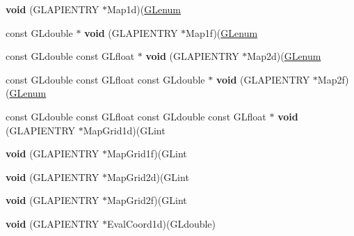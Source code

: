 \begin{DoxyCompactItemize}
{\bfseries void} (G\+L\+A\+P\+I\+E\+N\+T\+RY $\ast$Map1d)(\hyperlink{interfacevoid}{G\+Lenum}
\item 
\mbox{\label{struct_____g_ldispatch_table_rec_a715462dc54fd705c0dee53e9518c5414}} 
const G\+Ldouble $\ast$ {\bfseries void} (G\+L\+A\+P\+I\+E\+N\+T\+RY $\ast$Map1f)(\hyperlink{interfacevoid}{G\+Lenum}
\item 
\mbox{\label{struct_____g_ldispatch_table_rec_a8ffaff6e7fedf7ed349976aed5d0059e}} 
const G\+Ldouble const G\+Lfloat $\ast$ {\bfseries void} (G\+L\+A\+P\+I\+E\+N\+T\+RY $\ast$Map2d)(\hyperlink{interfacevoid}{G\+Lenum}
\item 
\mbox{\label{struct_____g_ldispatch_table_rec_a94f55f081e5e57f2c75ac2ea428762a6}} 
const G\+Ldouble const G\+Lfloat const G\+Ldouble $\ast$ {\bfseries void} (G\+L\+A\+P\+I\+E\+N\+T\+RY $\ast$Map2f)(\hyperlink{interfacevoid}{G\+Lenum}
\item 
\mbox{\label{struct_____g_ldispatch_table_rec_a9ffaab280fc17f60499e109c55f8703e}} 
const G\+Ldouble const G\+Lfloat const G\+Ldouble const G\+Lfloat $\ast$ {\bfseries void} (G\+L\+A\+P\+I\+E\+N\+T\+RY $\ast$Map\+Grid1d)(G\+Lint
\item 
\mbox{\label{struct_____g_ldispatch_table_rec_a90043733f45a03e80999983325bc268e}} 
{\bfseries void} (G\+L\+A\+P\+I\+E\+N\+T\+RY $\ast$Map\+Grid1f)(G\+Lint
\item 
\mbox{\label{struct_____g_ldispatch_table_rec_a1ffde33c33066aec77d1b31bdda82805}} 
{\bfseries void} (G\+L\+A\+P\+I\+E\+N\+T\+RY $\ast$Map\+Grid2d)(G\+Lint
\item 
\mbox{\label{struct_____g_ldispatch_table_rec_aed7ff7db91f5efc55d08c3b24c917672}} 
{\bfseries void} (G\+L\+A\+P\+I\+E\+N\+T\+RY $\ast$Map\+Grid2f)(G\+Lint
\item 
\mbox{\label{struct_____g_ldispatch_table_rec_ad9c309727196d52634b6cc2209fce4d5}} 
{\bfseries void} (G\+L\+A\+P\+I\+E\+N\+T\+RY $\ast$Eval\+Coord1d)(G\+Ldouble)

\end{DoxyCompactItemize}
